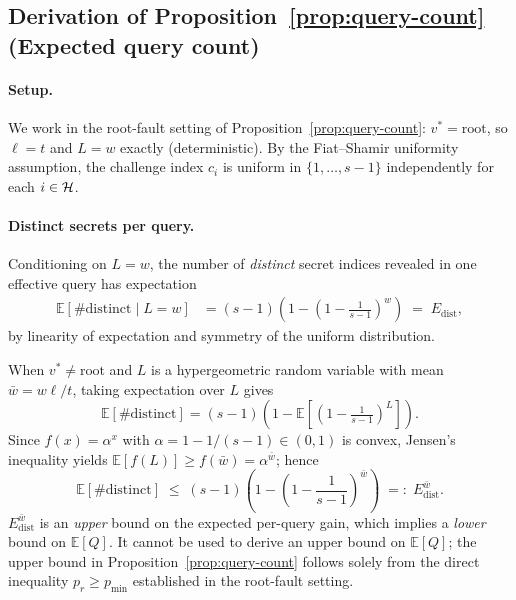 \subsection{Derivation of Proposition~\ref{prop:query-count}
  (Expected query count)}
\label{app:proof-query}

\paragraph{Setup.}
We work in the root-fault setting of Proposition~\ref{prop:query-count}:
\(v^* = \mathrm{root}\), so \(\ell = t\) and \(L = w\) exactly (deterministic).
By the Fiat--Shamir uniformity assumption, the challenge index \(c_i\) is
uniform in \(\{1,\ldots,s-1\}\) independently for each \(i \in \mathcal{H}\).

\paragraph{Distinct secrets per query.}
Conditioning on \(L = w\), the number of \emph{distinct} secret indices
revealed in one effective query has expectation
\begin{align}
  \mathbb{E}[\text{\#distinct} \mid L = w]
  &= (s-1)\!\left(1 - \left(1 - \frac{1}{s-1}\right)^{\!w}\right)
  \;=\; E_{\mathrm{dist}},
  \label{eq:edist-exact}
\end{align}
by linearity of expectation and symmetry of the uniform distribution.

\begin{remark}
When \(v^* \neq \mathrm{root}\) and \(L\) is a hypergeometric random variable
with mean \(\bar{w} = w\ell/t\), taking expectation over \(L\) gives
\[
  \mathbb{E}[\text{\#distinct}]
  = (s-1)\!\left(1 - \mathbb{E}\!\left[\left(1-\tfrac{1}{s-1}\right)^{\!L}\right]\right).
\]
Since \(f(x) = \alpha^x\) with \(\alpha = 1 - 1/(s-1) \in (0,1)\) is convex,
Jensen's inequality yields \(\mathbb{E}[f(L)] \geq f(\bar{w}) = \alpha^{\bar{w}}\);
hence
\begin{equation}
  \mathbb{E}[\text{\#distinct}]
  \;\leq\; (s-1)\!\left(1 - \left(1-\frac{1}{s-1}\right)^{\!\bar{w}}\right)
  \;=:\; E_{\mathrm{dist}}^{\bar{w}}.
  \label{eq:edist-jensen}
\end{equation}
\(E_{\mathrm{dist}}^{\bar{w}}\) is an \emph{upper} bound on the expected per-query
gain, which implies a \emph{lower} bound on \(\mathbb{E}[Q]\).  It cannot be
used to derive an upper bound on \(\mathbb{E}[Q]\); the upper bound in
Proposition~\ref{prop:query-count} follows solely from the direct inequality
\(p_r \geq p_{\min}\) established in the root-fault setting.
\end{remark}

